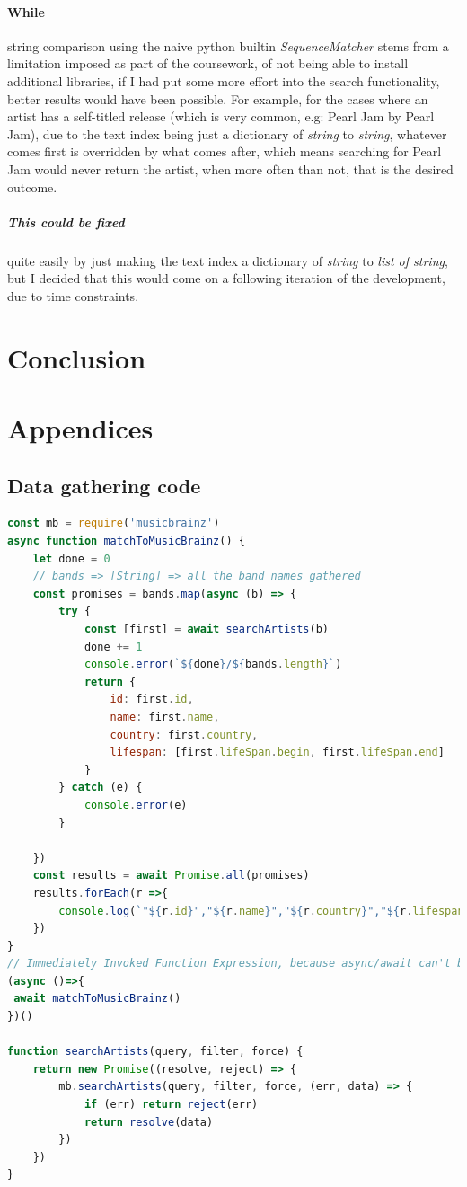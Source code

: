 \documentclass[10pt, a4paper]{article}
\begin{document}
	\paragraph{While} string comparison using the naive python builtin \textit{SequenceMatcher}  stems from a limitation imposed as part of the coursework, of not being able to install additional libraries, if I had put some more effort into the search functionality, better results would have been possible. For example, for the cases where an artist has a self-titled release (which is very common, e.g: Pearl Jam by Pearl Jam), due to the text index being just a dictionary of \textit{string} to \textit{string}, whatever comes first is overridden by what comes after, which means searching for Pearl Jam would never return the artist, when more often than not, that is the desired outcome.
	\subparagraph{This could be fixed} quite easily by just making the text index a dictionary of \textit{string} to \textit{list of string}, but I decided that this would come on a following iteration of the development, due to time constraints.
	
\section{Conclusion}	


\section{Appendices}
\subsection{Data gathering code}

\begin{lstlisting}[language=JavaScript, label=lst:artistLookup, caption = Artist name to MusicBrainzID lookup ]
const mb = require('musicbrainz')
async function matchToMusicBrainz() {
    let done = 0
    // bands => [String] => all the band names gathered
    const promises = bands.map(async (b) => {
        try {
            const [first] = await searchArtists(b)
            done += 1
            console.error(`${done}/${bands.length}`)
            return {
                id: first.id,
                name: first.name,
                country: first.country,
                lifespan: [first.lifeSpan.begin, first.lifeSpan.end]
            }
        } catch (e) {
            console.error(e)
        }

    })
    const results = await Promise.all(promises)
    results.forEach(r =>{
        console.log(`"${r.id}","${r.name}","${r.country}","${r.lifespan[0]} ${r.lifespan[1]}"`)
    })
}
// Immediately Invoked Function Expression, because async/await can't be used at top level
(async ()=>{
 await matchToMusicBrainz()
})()

function searchArtists(query, filter, force) {
    return new Promise((resolve, reject) => {
        mb.searchArtists(query, filter, force, (err, data) => {
            if (err) return reject(err)
            return resolve(data)
        })
    })
}
\end{lstlisting}
\end{document}
